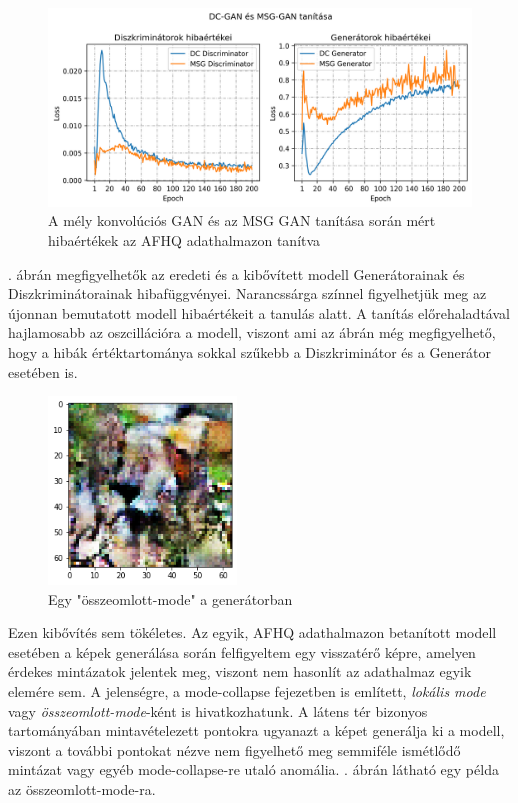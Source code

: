 \begin{figure}[h]
	\centering
	\includegraphics[width=15cm]{images/dc_vs_msg.png}
	\caption{A mély konvolúciós GAN és az MSG GAN tanítása során mért hibaértékek az AFHQ adathalmazon tanítva}
	\label{fig:dcvsmsg}
\end{figure}

. ábrán megfigyelhetők az eredeti és a kibővített modell Generátorainak és Diszkriminátorainak hibafüggvényei. Narancssárga színnel figyelhetjük meg az újonnan bemutatott modell hibaértékeit a tanulás alatt. A tanítás előrehaladtával hajlamosabb az oszcillációra a modell, viszont ami az ábrán még megfigyelhető, hogy a hibák értéktartománya sokkal szűkebb a Diszkriminátor és a Generátor esetében is.

\begin{figure}[h]
	\centering
	\includegraphics[width=5cm]{images/collapsed_mode.png}
	\caption{Egy "összeomlott-mode" a generátorban}
	\label{fig:collapsed_mode}
\end{figure}

Ezen kibővítés sem tökéletes. Az egyik, AFHQ adathalmazon betanított modell esetében a képek generálása során felfigyeltem egy visszatérő képre, amelyen érdekes mintázatok jelentek meg, viszont nem hasonlít az adathalmaz egyik elemére sem. A jelenségre, a mode-collapse fejezetben is említett, \textit{lokális mode} vagy \textit{összeomlott-mode}-ként is hivatkozhatunk. A látens tér bizonyos tartományában mintavételezett pontokra ugyanazt a képet generálja ki a modell, viszont a további pontokat nézve nem figyelhető meg semmiféle ismétlődő mintázat vagy egyéb mode-collapse-re utaló anomália. . ábrán látható egy példa az összeomlott-mode-ra. 

